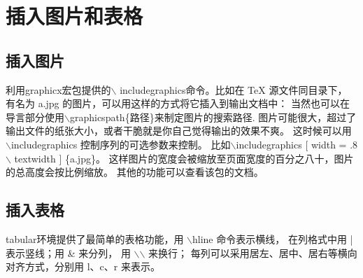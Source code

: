 \section{插入图片和表格}
\subsection{插入图片}
利用graphicx宏包提供的$\backslash$ includegraphics命令。比如在 TeX 源文件同目录下，
有名为 a.jpg 的图片，可以用这样的方式将它插入到输出文档中：
当然也可以在导言部分使用$\backslash$graphicspath\-\{路径\}来制定图片的搜索路径.
图片可能很大，超过了输出文件的纸张大小，或者干脆就是你自己觉得输出的效果不爽。
这时候可以用 $\backslash$includegraphics 控制序列的可选参数来控制。
比如$\backslash$includegraphics [ width = .8$\backslash$ textwidth ] \{a.jpg\}。
这样图片的宽度会被缩放至页面宽度的百分之八十，图片的总高度会按比例缩放。
其他的功能可以查看该包的文档。

\subsection{插入表格}
tabular环境提供了最简单的表格功能，用 $\backslash$hline 命令表示横线，
在列格式中用 | 表示竖线；用 \& 来分列，
用 $\backslash$$\backslash$ 来换行；
每列可以采用居左、居中、居右等横向对齐方式，分别用 l、c、r 来表示。

